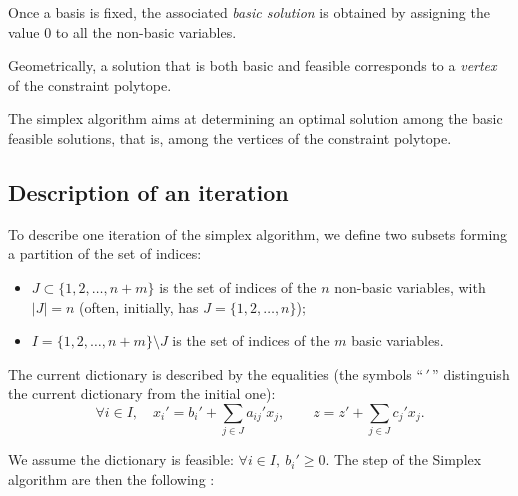 \begin{definition}
    Once a basis is fixed, the associated \emph{basic solution} is obtained by assigning the value $0$ to all the non-basic variables.
\end{definition}

\begin{remark}
    Geometrically, a solution that is both basic and feasible corresponds to a \emph{vertex} of the constraint polytope. 
    
    The simplex algorithm aims at determining an optimal solution among the basic feasible solutions, that is, among the vertices of the constraint polytope.
\end{remark}

\subsection{Description of an iteration}

To describe one iteration of the simplex algorithm, we define two subsets forming a partition of the set of indices:

\begin{itemize}
  \item $J \subset \{1,2,\dots,n+m\}$ is the set of indices of the $n$ non-basic variables, with $|J|=n$ (often, initially, has $J=\{1,2,\dots,n\}$);
  \item $I = \{1,2,\dots,n+m\} \setminus J$ is the set of indices of the $m$ basic variables.
\end{itemize}

The current dictionary is described by the equalities (the symbols “$\,'\,$” distinguish the current dictionary from the initial one):
\[
   \forall i \in I, \quad x_i' = b_i' + \sum_{j \in J} a_{ij}' x_j,
   \qquad 
   z = z' + \sum_{j \in J} c_j' x_j .
\]

We assume the dictionary is feasible: $\forall i \in I, \ b_i' \geq 0$. The step of the Simplex algorithm are then the following :

